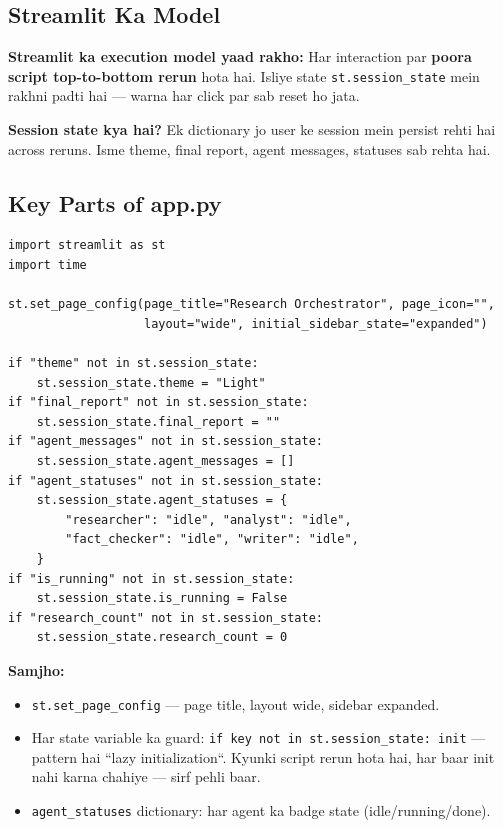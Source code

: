 \documentclass[11pt, a4paper]{article}
\begin{document}
\subsection{Streamlit Ka Model}

\begin{conceptbox}
\textbf{Streamlit ka execution model yaad rakho:} Har interaction par \textbf{poora script top-to-bottom rerun} hota hai. Isliye state \texttt{st.session\_state} mein rakhni padti hai --- warna har click par sab reset ho jata.

\textbf{Session state kya hai?} Ek dictionary jo user ke session mein persist rehti hai across reruns. Isme theme, final report, agent messages, statuses sab rehta hai.
\end{conceptbox}

\subsection{Key Parts of app.py}

\begin{lstlisting}[style=pythonstyle, caption={app.py --- Session State + Theme}]
import streamlit as st
import time

st.set_page_config(page_title="Research Orchestrator", page_icon="",
                   layout="wide", initial_sidebar_state="expanded")

if "theme" not in st.session_state:
    st.session_state.theme = "Light"
if "final_report" not in st.session_state:
    st.session_state.final_report = ""
if "agent_messages" not in st.session_state:
    st.session_state.agent_messages = []
if "agent_statuses" not in st.session_state:
    st.session_state.agent_statuses = {
        "researcher": "idle", "analyst": "idle",
        "fact_checker": "idle", "writer": "idle",
    }
if "is_running" not in st.session_state:
    st.session_state.is_running = False
if "research_count" not in st.session_state:
    st.session_state.research_count = 0
\end{lstlisting}

\begin{codestorybox}
\textbf{Samjho:}
\begin{itemize}
\item \texttt{st.set\_page\_config} --- page title, layout wide, sidebar expanded.
\item Har state variable ka guard: \texttt{if key not in st.session\_state: init} --- pattern hai ``lazy initialization``. Kyunki script rerun hota hai, har baar init nahi karna chahiye --- sirf pehli baar.
\item \texttt{agent\_statuses} dictionary: har agent ka badge state (idle/running/done).
\end{itemize}
\end{codestorybox}
\end{document}
